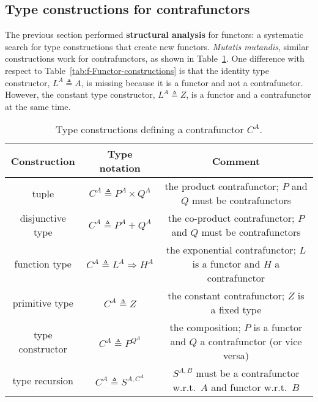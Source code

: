 \subsection{Type constructions for contrafunctors\label{subsec:f-Contrafunctor-constructions}}

The previous section performed \textbf{structural analysis}
for functors: a systematic search for type constructions that create
new functors.\emph{ Mutatis mutandis}, similar constructions work
for contrafunctors, as shown in Table~\ref{tab:f-Contrafunctor-constructions}.
One difference with respect to Table~\ref{tab:f-Functor-constructions}
is that the identity type constructor, $L^{A}\triangleq A$, is missing
because it is a functor and not a contrafunctor. However, the constant
type constructor, $L^{A}\triangleq Z$, is a functor and a contrafunctor
at the same time.

\begin{table}
\begin{centering}
\begin{tabular}{|c|c|c|}
\hline 
\textbf{\small{}Construction} & \textbf{\small{}Type notation} & \textbf{\small{}Comment}\tabularnewline
\hline 
\hline 
{\footnotesize{}tuple} & {\footnotesize{}$C^{A}\triangleq P^{A}\times Q^{A}$} & {\footnotesize{}the product contrafunctor; $P$ and $Q$ must be contrafunctors}\tabularnewline
\hline 
{\footnotesize{}disjunctive type} & {\footnotesize{}$C^{A}\triangleq P^{A}+Q^{A}$} & {\footnotesize{}the co-product contrafunctor; $P$ and $Q$ must be
contrafunctors}\tabularnewline
\hline 
{\footnotesize{}function type} & {\footnotesize{}$C^{A}\triangleq L^{A}\Rightarrow H^{A}$} & {\footnotesize{}the exponential contrafunctor; $L$ is a functor and
$H$ a contrafunctor}\tabularnewline
\hline 
{\footnotesize{}primitive type} & {\footnotesize{}$C^{A}\triangleq Z$} & {\footnotesize{}the constant contrafunctor; $Z$ is a fixed type}\tabularnewline
\hline 
{\footnotesize{}type constructor} & {\footnotesize{}$C^{A}\triangleq P^{Q^{A}}$} & {\footnotesize{}the composition; $P$ is a functor and $Q$ a contrafunctor
(or vice versa)}\tabularnewline
\hline 
{\footnotesize{}type recursion} & {\footnotesize{}$C^{A}\triangleq S^{A,C^{A}}$} & {\footnotesize{}$S^{A,B}$ must be a contrafunctor w.r.t.~$A$ and
functor w.r.t.~$B$}\tabularnewline
\hline 
\end{tabular}
\par\end{centering}
\caption{Type constructions defining a contrafunctor $C^{A}$.\label{tab:f-Contrafunctor-constructions}}
\end{table}

